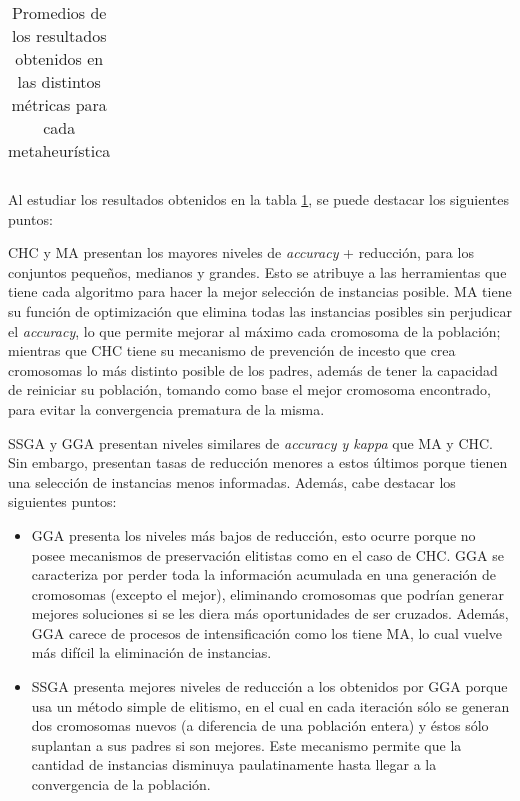 \begin{table}[h!]
\begin{adjustbox}{max width =\textwidth}
\begin{tabular}{l c c c c c c c}
\hline
\end{tabular}
\end{adjustbox}
\caption{Promedios de los resultados obtenidos en las distintos métricas para cada metaheurística}
\label{meta}

\end{table}

Al estudiar los resultados obtenidos en la tabla \ref{meta}, se puede destacar los siguientes puntos:

CHC y MA presentan los mayores niveles de \emph{accuracy} + reducción, para los conjuntos pequeños, medianos y grandes. Esto se atribuye a las herramientas que tiene cada algoritmo para hacer la mejor selección de instancias posible. MA tiene su función de optimización que elimina todas las instancias posibles sin perjudicar el \emph{accuracy}, lo que permite mejorar al máximo cada cromosoma de la población; mientras que CHC tiene su mecanismo de prevención de incesto que crea cromosomas lo más distinto posible de los padres, además de tener la capacidad de reiniciar su población, tomando como base el mejor cromosoma encontrado, para evitar la convergencia prematura de la misma.

SSGA y GGA presentan niveles similares de \emph{accuracy y kappa} que MA y CHC. Sin embargo, presentan tasas de reducción menores a estos últimos porque tienen una selección de instancias menos informadas. Además, cabe destacar los siguientes puntos:

\begin{itemize}

\item GGA presenta los niveles más bajos de reducción, esto ocurre porque no posee mecanismos de preservación elitistas como en el caso de CHC. GGA se caracteriza por perder toda la información acumulada en una generación de cromosomas (excepto el mejor), eliminando cromosomas que podrían generar mejores soluciones si se les diera más oportunidades de ser cruzados. Además, GGA carece de procesos de intensificación como los tiene MA, lo cual vuelve más difícil la eliminación de instancias.

\item SSGA presenta mejores niveles de reducción a los obtenidos por GGA porque usa un método simple de elitismo, en el cual en cada iteración sólo se generan dos cromosomas nuevos (a diferencia de una población entera) y éstos sólo suplantan a sus padres si son mejores. Este mecanismo permite que la cantidad de instancias disminuya paulatinamente hasta llegar a la convergencia de la población.

\end{itemize}


